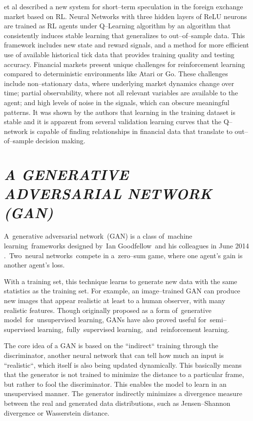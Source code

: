 \documentclass[12pt,a4paper]{report}
\numberwithin{equation}{section}
\begin{document}
et al \cite{horta2018reinforcement_60} described a new system for short--term speculation in the
foreign exchange market based on RL. Neural Networks with three hidden
layers of ReLU neurons are trained as RL agents under Q--Learning
algorithm by an algorithm that consistently induces stable learning that
generalizes to out--of--sample data. This framework includes new state and
reward signals, and a method for more efficient use of available
historical tick data that provides training quality and testing
accuracy. Financial markets present unique challenges for reinforcement
learning compared to deterministic environments like Atari or Go. These
challenges include non--stationary data, where underlying market dynamics
change over time; partial observability, where not all relevant
variables are available to the agent; and high levels of noise in the
signals, which can obscure meaningful patterns. It was shown by the
authors that learning in the training dataset is stable and it is
apparent from several validation learning curves that the Q--network is
capable of finding relationships in financial data that translate to
out--of--sample decision making.

\hypertarget{a--generative--adversarial--network--gan}{%
\section{\texorpdfstring{\emph{\textbf{A GENERATIVE ADVERSARIAL
NETWORK
(GAN)}}}{A GENERATIVE ADVERSARIAL NETWORK (GAN)}}\label{a--generative--adversarial--network--gan}}

A~generative adversarial network~(GAN) is a class of~machine
learning~frameworks designed by~Ian Goodfellow~and his colleagues in
June 2014 \cite{goodfellow2014generative_61}.~Two~neural networks~compete in a~zero--sum game,
where one agent's gain is another agent's loss.

With a training set, this technique learns to generate new data with the
same statistics as the training set. For example, an image--trained GAN
can produce new images that appear realistic at least to a human
observer, with many realistic features. Though originally proposed as a
form of~generative model~for~unsupervised learning, GANs have also
proved useful for~semi--supervised learning,~fully~supervised
learning,~and~reinforcement learning.

The core idea of a GAN is based on the ``indirect`` training through the
discriminator, another neural network that can tell how much an input is
``realistic``, which itself is also being updated dynamically. This
basically means that the generator is not trained to minimize the
distance to a particular frame, but rather to fool the discriminator.
This enables the model to learn in an unsupervised manner. The generator
indirectly minimizes a divergence measure between the real and generated
data distributions, such as Jensen--Shannon divergence or Wasserstein
distance.
\end{document}
